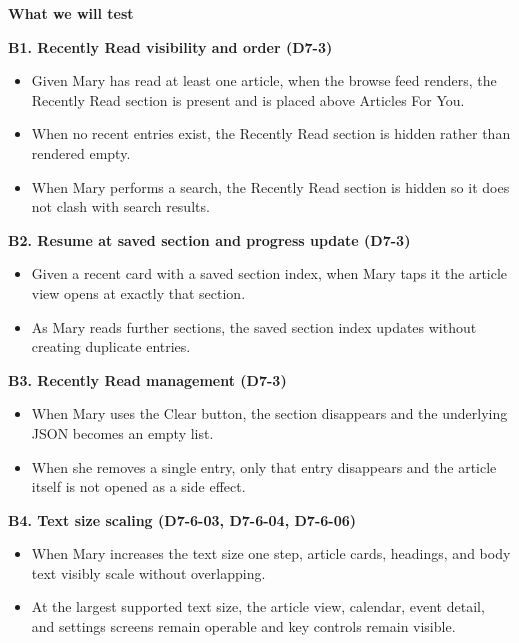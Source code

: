 \documentclass[a4paper, 12pt]{article}
\begin{document}
    \textbf{What we will test}

    \textbf{B1. Recently Read visibility and order (D7-3)}

    \begin{itemize}
        \item Given Mary has read at least one article, when the browse feed
            renders, the Recently Read section is present and is placed above Articles
            For You.

        \item When no recent entries exist, the Recently Read section is hidden
            rather than rendered empty.

        \item When Mary performs a search, the Recently Read section is hidden
            so it does not clash with search results.
    \end{itemize}

    \textbf{B2. Resume at saved section and progress update (D7-3)}

    \begin{itemize}
        \item Given a recent card with a saved section index, when Mary taps it
            the article view opens at exactly that section.

        \item As Mary reads further sections, the saved section index updates
            without creating duplicate entries.
    \end{itemize}

    \textbf{B3. Recently Read management (D7-3)}

    \begin{itemize}
        \item When Mary uses the Clear button, the section disappears and the
            underlying JSON becomes an empty list.

        \item When she removes a single entry, only that entry disappears and
            the article itself is not opened as a side effect.
    \end{itemize}

    \textbf{B4. Text size scaling (D7-6-03, D7-6-04, D7-6-06)}

    \begin{itemize}
        \item When Mary increases the text size one step, article cards, headings,
            and body text visibly scale without overlapping.

        \item At the largest supported text size, the article view, calendar,
            event detail, and settings screens remain operable and key controls remain
            visible.
    \end{itemize}
\end{document}
